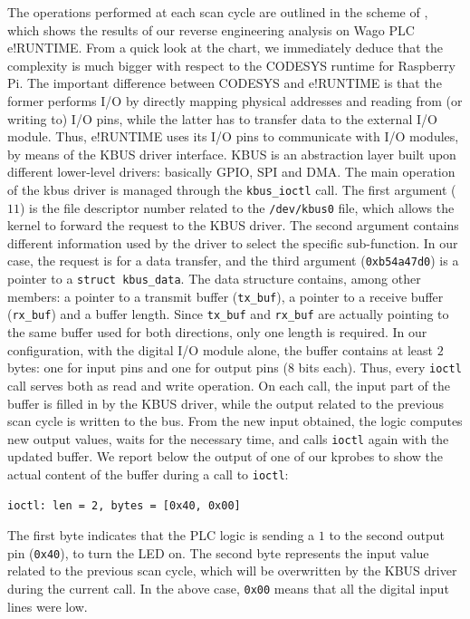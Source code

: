 The operations performed at each scan cycle are outlined in the scheme of , which shows the results of our reverse engineering analysis on Wago PLC e!RUNTIME.
From a quick look at the chart, we immediately deduce that the complexity is much bigger with respect to the CODESYS runtime for Raspberry Pi.
The important difference between CODESYS and e!RUNTIME is that the former performs I/O by directly mapping physical addresses and reading from (or writing to) I/O pins,
while the latter has to transfer data to the external I/O module. Thus, e!RUNTIME uses its I/O pins to communicate with I/O modules, by means of the KBUS driver interface.
KBUS is an abstraction layer built upon different lower-level drivers: basically GPIO, SPI and DMA.
The main operation of the kbus driver is managed through the \verb|kbus_ioctl| call. The first argument ($11$) is the file descriptor number related to the \verb|/dev/kbus0| file,
which allows the kernel to forward the request to the KBUS driver. The second argument contains different information used by the driver to select the specific sub-function.
In our case, the request is for a data transfer, and the third argument (\verb|0xb54a47d0|) is a pointer to a \verb|struct kbus_data|.
The data structure contains, among other members: a pointer to a transmit buffer (\verb|tx_buf|), a pointer to a receive buffer (\verb|rx_buf|) and a buffer length.
Since \verb|tx_buf| and \verb|rx_buf| are actually pointing to the same buffer used for both directions, only one length is required.
In our configuration, with the digital I/O module alone, the buffer contains at least $2$ bytes: one for input pins and one for output pins ($8$ bits each).
Thus, every \verb|ioctl| call serves both as read and write operation. On each call, the input part of the buffer is filled in by the KBUS driver,
while the output related to the previous scan cycle is written to the bus. From the new input obtained, the logic computes new output values,
waits for the necessary time, and calls \verb|ioctl| again with the updated buffer.
We report below the output of one of our kprobes to show the actual content of the buffer during a call to \verb|ioctl|:
\begin{Verbatim}[fontsize=\small]
	ioctl: len = 2, bytes = [0x40, 0x00]
\end{Verbatim}
The first byte indicates that the PLC logic is sending a $1$ to the second output pin (\verb|0x40|), to turn the LED on.
The second byte represents the input value related to the previous scan cycle, which will be overwritten by the KBUS driver during the current call.
In the above case, \verb|0x00| means that all the digital input lines were low.

